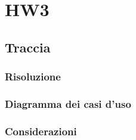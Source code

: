 \documentclass{article}
\begin{document}
\pagestyle{empty}

\section*{HW3}
\large

\subsection*{Traccia}
\large

\subsubsection*{Risoluzione}
\large

\subsubsection*{Diagramma dei casi d'uso}
\large

\subsubsection*{Considerazioni}
\large
\end{document}

